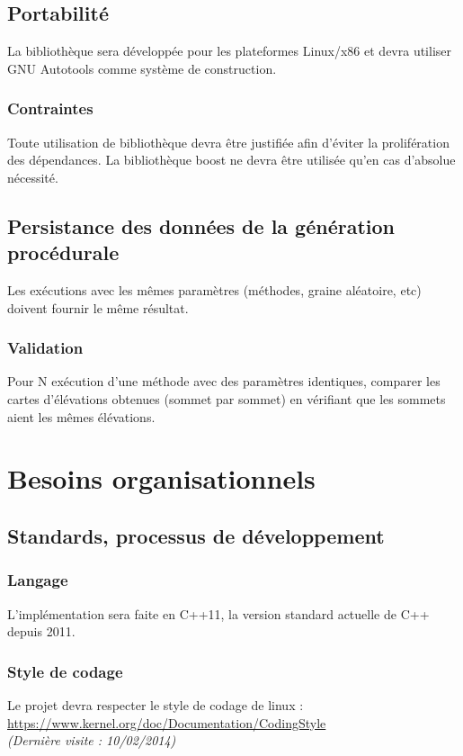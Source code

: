 \subsection{Portabilité}
La bibliothèque sera développée pour les plateformes Linux/x86 et devra utiliser
GNU Autotools comme système de construction.

\subsubsection{Contraintes}
Toute utilisation de bibliothèque devra \^etre justifiée afin d'éviter la prolifération des dépendances. La bibliothèque boost ne devra \^etre utilisée qu'en cas d'absolue nécessité.

\subsection{Persistance des données de la génération procédurale}
Les exécutions avec les mêmes paramètres (méthodes, graine aléatoire, etc)
doivent fournir le même résultat.

\subsubsection{Validation}
Pour N exécution d'une méthode avec des paramètres identiques, comparer les cartes d'élévations obtenues (sommet par sommet) en vérifiant que les sommets aient les mêmes élévations. 

\section{Besoins organisationnels}

\subsection{Standards, processus de développement}

\subsubsection{Langage}
L'implémentation sera faite en C++11, la version standard actuelle de C++ depuis
2011.

\subsubsection{Style de codage}
Le projet devra respecter le style de codage de linux :\\
\url{https://www.kernel.org/doc/Documentation/CodingStyle}\\
\emph{(Dernière visite : 10/02/2014)}

